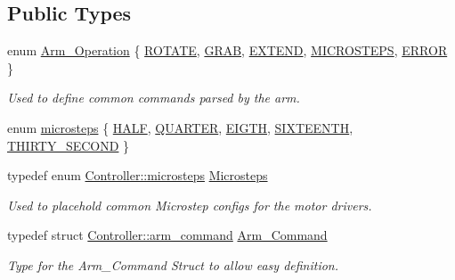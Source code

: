 \subsection*{Public Types}
\begin{DoxyCompactItemize}
\item 
enum \hyperlink{class_controller_a91a5751dd6920daf3b70814171b51767}{Arm\+\_\+\+Operation} \{ \newline
\hyperlink{class_controller_a91a5751dd6920daf3b70814171b51767a99ba9596fbe683c122b76174e7d40b8e}{R\+O\+T\+A\+TE}, 
\hyperlink{class_controller_a91a5751dd6920daf3b70814171b51767a41ed83326fd9ad04a2d24a228bc7a7ef}{G\+R\+AB}, 
\hyperlink{class_controller_a91a5751dd6920daf3b70814171b51767a1f9769fc0e78abe69b7a4ad5d573eb6c}{E\+X\+T\+E\+ND}, 
\hyperlink{class_controller_a91a5751dd6920daf3b70814171b51767a7d0e6ebddd2cb5dc5fb2100c018cc6d8}{M\+I\+C\+R\+O\+S\+T\+E\+PS}, 
\newline
\hyperlink{class_controller_a91a5751dd6920daf3b70814171b51767ae276bf8b30c8b606b54d8fb7d92c1ee6}{E\+R\+R\+OR}
 \}\begin{DoxyCompactList}\small\item\em Used to define common commands parsed by the arm. \end{DoxyCompactList}
\item 
enum \hyperlink{class_controller_aa94f1aea40982c422a43c1ee5aea0c49}{microsteps} \{ \newline
\hyperlink{class_controller_aa94f1aea40982c422a43c1ee5aea0c49a7c6a23455db73e86dcfafcb0025ac5dd}{H\+A\+LF}, 
\hyperlink{class_controller_aa94f1aea40982c422a43c1ee5aea0c49aa4e1dc476afca095736e176eb109dc11}{Q\+U\+A\+R\+T\+ER}, 
\hyperlink{class_controller_aa94f1aea40982c422a43c1ee5aea0c49a99f575098d1be025c224acc42fd921a0}{E\+I\+G\+TH}, 
\hyperlink{class_controller_aa94f1aea40982c422a43c1ee5aea0c49af214e4647ac3115a559b96a464219371}{S\+I\+X\+T\+E\+E\+N\+TH}, 
\newline
\hyperlink{class_controller_aa94f1aea40982c422a43c1ee5aea0c49aad17f41f310f462eb36ac9f6bac29b57}{T\+H\+I\+R\+T\+Y\+\_\+\+S\+E\+C\+O\+ND}
 \}
\item 
\mbox{\label{class_controller_ab45ad0d63abd4b57021f13810fc856d3}} 
typedef enum \hyperlink{class_controller_aa94f1aea40982c422a43c1ee5aea0c49}{Controller\+::microsteps} \hyperlink{class_controller_ab45ad0d63abd4b57021f13810fc856d3}{Microsteps}
\begin{DoxyCompactList}\small\item\em Used to placehold common Microstep configs for the motor drivers. \end{DoxyCompactList}\item 
typedef struct \hyperlink{struct_controller_1_1arm__command}{Controller\+::arm\+\_\+command} \hyperlink{class_controller_ac48cc99091f83f149fef8f17fd5d7e7f}{Arm\+\_\+\+Command}
\begin{DoxyCompactList}\small\item\em Type for the Arm\+\_\+\+Command Struct to allow easy definition. \end{DoxyCompactList}\end{DoxyCompactItemize}
